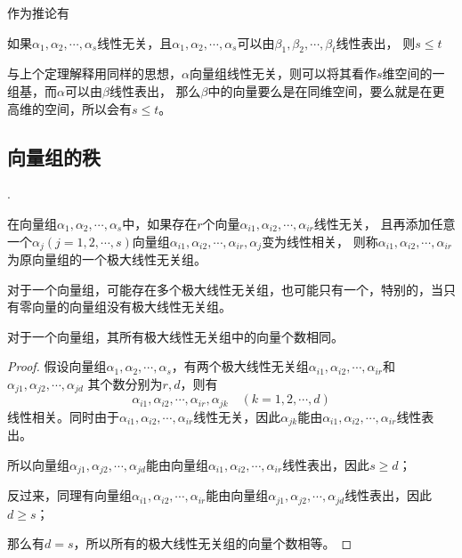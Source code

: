 作为推论有
\begin{theorem}
    如果$\alpha_1,\alpha_2,\cdots,\alpha_s$线性无关，且$\alpha_1,\alpha_2,\cdots,\alpha_s$可以由$\beta_1,\beta_2,\cdots,\beta_t$线性表出，
    则$s\leq t$
\end{theorem}
与上个定理解释用同样的思想，$\alpha$向量组线性无关，则可以将其看作$s$维空间的一组基，而$\alpha$可以由$\beta$线性表出，
那么$\beta$中的向量要么是在同维空间，要么就是在更高维的空间，所以会有$s\leq t$。

\subsection{向量组的秩}
.
\begin{definition}
    在向量组$\alpha_1,\alpha_2,\cdots,\alpha_s$中，如果存在$r$个向量$\alpha_{i1},\alpha_{i2},\cdots,\alpha_{ir}$线性无关，
    且再添加任意一个$\alpha_j(j=1,2,\cdots,s)$向量组$\alpha_{i1},\alpha_{i2},\cdots,\alpha_{ir},\alpha_j$变为线性相关，
    则称$\alpha_{i1},\alpha_{i2},\cdots,\alpha_{ir}$为原向量组的一个极大线性无关组。
\end{definition}

对于一个向量组，可能存在多个极大线性无关组，也可能只有一个，特别的，当只有零向量的向量组没有极大线性无关组。
\begin{theorem}
    对于一个向量组，其所有极大线性无关组中的向量个数相同。
\end{theorem}
\begin{proof}
    假设向量组$\alpha_1,\alpha_2,\cdots,\alpha_s$，有两个极大线性无关组$\alpha_{i1},\alpha_{i2},\cdots,\alpha_{ir}$和$\alpha_{j1},\alpha_{j2},\cdots,\alpha_{jd}$
    其个数分别为$r,d$，则有
    \[ \alpha_{i1},\alpha_{i2},\cdots,\alpha_{ir},\alpha_{jk}\quad (k=1,2,\cdots,d) \]
    线性相关。同时由于$\alpha_{i1},\alpha_{i2},\cdots,\alpha_{ir}$线性无关，因此$\alpha_{jk}$能由$\alpha_{i1},\alpha_{i2},\cdots,\alpha_{ir}$线性表出。

    所以向量组$\alpha_{j1},\alpha_{j2},\cdots,\alpha_{jd}$能由向量组$\alpha_{i1},\alpha_{i2},\cdots,\alpha_{ir}$线性表出，因此$s\geq d$；

    反过来，同理有向量组$\alpha_{i1},\alpha_{i2},\cdots,\alpha_{ir}$能由向量组$\alpha_{j1},\alpha_{j2},\cdots,\alpha_{jd}$线性表出，因此$d\geq s$；

    那么有$d=s$，所以所有的极大线性无关组的向量个数相等。
\end{proof}

